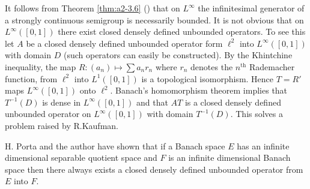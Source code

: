 \begin{remark*}[Final]\label{rem:a2-final}
It follows from Theorem \ref{thm:a2-3.6} () that on $L^{\infty}$ the infinitesimal generator of a strongly continuous semigroup is necessarily bounded.
It is not obvious that on $L^{\infty}([0,1])$ there exist closed densely defined unbounded operators.
To see this let $A$ be a closed densely defined unbounded operator form $\ell^2$ into $L^{\infty}([0,1])$ with domain $D$ (such operators can easily be constructed).
By the Khintchine inequality, the map $R \colon (a_{n}) \mapsto \sum a_{n}r_{n}$ where $r_{n}$ denotes the $n^{\text{th}}$ Rademacher function, from $\ell^2$ into $L^1([0,1])$ is a topological isomorphism.
Hence $T = R'$ maps $L^{\infty}([0,1])$ onto $\ell^2$.
Banach's homomorphism theorem implies that $T^{-1}(D)$ is dense in $L^{\infty}([0,1])$ and that $AT$ is a closed densely defined unbounded operator on $L^{\infty}([0,1])$ with domain $T^{-1}(D)$.
This solves a problem raised by R.Kaufman.

H. Porta and the author have shown that if a Banach space $E$ has an infinite dimensional separable quotient space and $F$ is an infinite dimensional Banach space then there always exists a closed densely defined unbounded operator from $E$ into $F$.
\end{remark*}

